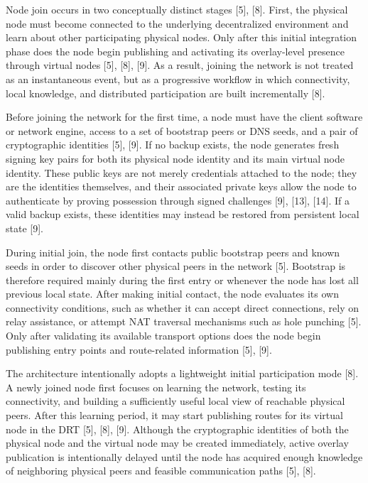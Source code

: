 \documentclass[12pt,a4paper]{article}
\begin{document}
Node join occurs in two conceptually distinct stages [5], [8]. First, the physical node must become connected to the underlying decentralized environment and learn about other participating physical nodes. Only after this initial integration phase does the node begin publishing and activating its overlay-level presence through virtual nodes [5], [8], [9]. As a result, joining the network is not treated as an instantaneous event, but as a progressive workflow in which connectivity, local knowledge, and distributed participation are built incrementally [8].

Before joining the network for the first time, a node must have the client software or network engine, access to a set of bootstrap peers or DNS seeds, and a pair of cryptographic identities [5], [9]. If no backup exists, the node generates fresh signing key pairs for both its physical node identity and its main virtual node identity. These public keys are not merely credentials attached to the node; they are the identities themselves, and their associated private keys allow the node to authenticate by proving possession through signed challenges [9], [13], [14]. If a valid backup exists, these identities may instead be restored from persistent local state [9].

During initial join, the node first contacts public bootstrap peers and known seeds in order to discover other physical peers in the network [5]. Bootstrap is therefore required mainly during the first entry or whenever the node has lost all previous local state. After making initial contact, the node evaluates its own connectivity conditions, such as whether it can accept direct connections, rely on relay assistance, or attempt NAT traversal mechanisms such as hole punching [5]. Only after validating its available transport options does the node begin publishing entry points and route-related information [5], [9].

The architecture intentionally adopts a lightweight initial participation mode [8]. A newly joined node first focuses on learning the network, testing its connectivity, and building a sufficiently useful local view of reachable physical peers. After this learning period, it may start publishing routes for its virtual node in the DRT [5], [8], [9]. Although the cryptographic identities of both the physical node and the virtual node may be created immediately, active overlay publication is intentionally delayed until the node has acquired enough knowledge of neighboring physical peers and feasible communication paths [5], [8].
\end{document}
